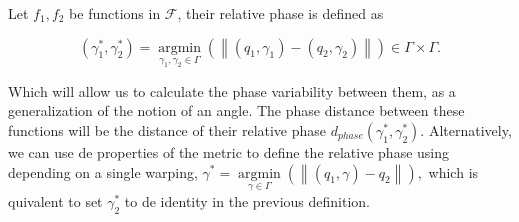 Let $f_1, f_2$ be functions in $\mathcal{F}$, their relative phase is defined as

$$
\left(\gamma_{1}^{*}, \gamma_{2}^{*}\right)=\underset{\gamma_{1}, \gamma_{2} \in \Gamma}{\operatorname{argmin}}\left(\left\|\left(q_{1}, \gamma_{1}\right)-\left(q_{2}, \gamma_{2}\right)\right\|\right) \in \Gamma \times \Gamma.
$$

Which will allow us to calculate the phase variability between them,
as a generalization of the notion of an angle. The phase distance between these
functions will be the distance of their relative phase 
$d_{phase} (\gamma_{1}^{*}, \gamma_{2}^{*})$. Alternatively, we can use de properties of
the metric to define the relative phase using depending on a single warping,
$
\gamma^{*}=\underset{\gamma \in \Gamma}{\operatorname{argmin}}\left(\left\|\left(q_{1}, \gamma \right)- q_{2}\right\|\right),
$
which is quivalent to set $\gamma_2^*$ to de identity in the previous definition.


